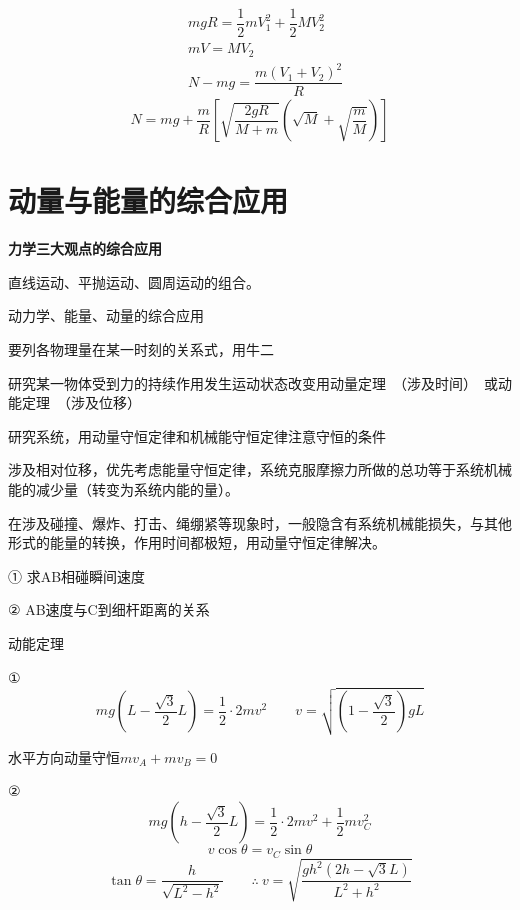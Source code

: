 \begin{problem}
\begin{solution}
\begin{align*}
&mgR=\dfrac12mV_1^2+\dfrac12MV_2^2\\
&mV=MV_2\\
&N-mg=\dfrac{m(V_1+V_2)^2}{R}
\end{align*}
\[ N=mg+\dfrac{m}{R}\left[\sqrt{\dfrac{2gR}{M+m}}\left(\sqrt{M}+\sqrt{\dfrac{m}{M}}\right)\right] \]
\end{solution}
\end{problem}


\section{动量与能量的综合应用}
\textbf{力学三大观点的综合应用}

直线运动、平抛运动、圆周运动的组合。

动力学、能量、动量的综合应用

要列各物理量在某一时刻的关系式，用牛二

研究某一物体受到力的持续作用发生运动状态改变\quad 用动量定理\ （涉及时间）\ 或动能定理\ （涉及位移） %

研究系统，用动量守恒定律和机械能守恒定律\quad 注意守恒的条件

涉及相对位移，优先考虑能量守恒定律，系统克服摩擦力所做的总功等于系统机械能的减少量（转变为系统内能的量）。

在涉及碰撞、爆炸、打击、绳绷紧等现象时，一般隐含有系统机械能损失，与其他形式的能量的转换，作用时间都极短，用动量守恒定律解决。

\begin{problem}[1.]

① 求AB相碰瞬间速度

② AB速度与C到细杆距离的关系
\begin{solution}
动能定理

① \[ mg\left(L-\frac{\sqrt{3}}{2}L\right)=\frac{1}{2}\cdot 2mv^2 \qquad v=\sqrt{\left(1-\frac{\sqrt{3}}{2}\right)gL} \]

水平方向动量守恒\quad $mv_A+mv_B=0$


② \[ mg\left(h-\frac{\sqrt{3}}{2}L\right)=\frac{1}{2}\cdot 2mv^2+\frac{1}{2}mv_C^2 \]
\[ v\cos\theta=v_C\sin\theta \]
\[ \tan\theta=\frac{h}{\sqrt{L^2-h^2}}\qquad\therefore\ v=\sqrt{\frac{gh^2\left(2h-\sqrt{3}L\right)}{L^2+h^2}} \]
\end{solution}
\end{problem}

